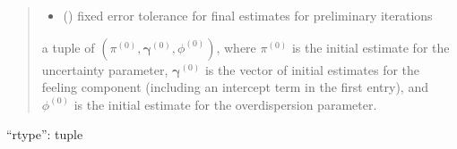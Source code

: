 \documentclass[letterpaper,10pt,english]{sphinxmanual}
\begin{document}
\begin{fulllineitems}
\begin{quote}
\begin{description}
\begin{itemize}
\item {} 
\sphinxAtStartPar
{} () \textendash{} fixed error tolerance for final estimates for preliminary iterations

\end{itemize}

\sphinxAtStartPar
a tuple of \((\pi^{(0)}, \pmb \gamma^{(0)}, \phi^{(0)})\), where \(\pi^{(0)}\) is the initial 
estimate for the uncertainty parameter, 
\(\pmb \gamma^{(0)}\) is the vector of initial estimates for the feeling component (including an intercept 
term in the first entry),
and \(\phi^{(0)}\) is the initial estimate for the overdispersion parameter.

\end{description}\end{quote}

\sphinxAtStartPar
“rtype”: tuple

\end{fulllineitems}

\end{document}
